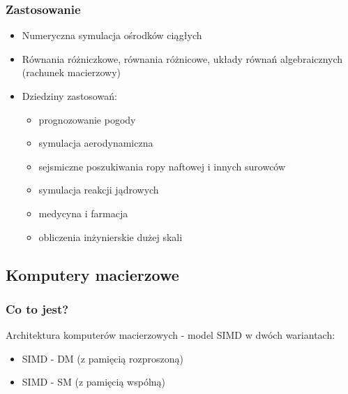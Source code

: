 		\subsubsection{Zastosowanie}
			\begin{itemize}
				\item Numeryczna symulacja ośrodków ciągłych
				\item Równania różniczkowe, równania różnicowe, układy równań algebraicznych (rachunek macierzowy)
				\item Dziedziny zastosowań:
				\begin{itemize}
					\item prognozowanie pogody
					\item symulacja aerodynamiczna
					\item sejsmiczne poszukiwania ropy naftowej i innych surowców
					\item symulacja reakcji jądrowych
					\item medycyna i farmacja
					\item obliczenia inżynierskie dużej skali
				\end{itemize}
			\end{itemize}
	
	\newpage
	\subsection{Komputery macierzowe}
		\subsubsection{Co to jest?}
			Architektura komputerów macierzowych - model SIMD w dwóch wariantach:
			\begin{itemize}
				\item SIMD - DM (z pamięcią rozproszoną)
				\item SIMD - SM (z pamięcią wspólną)
			\end{itemize}
		
